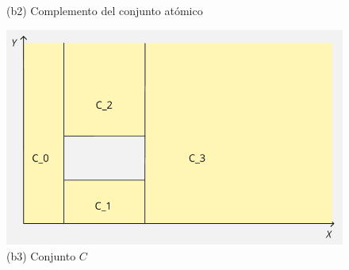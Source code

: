 \begin{figure}[H]
\begin{minipage}{0.31\textwidth}
        \caption*{     \centering (b2) Complemento del conjunto atómico}
    \end{minipage}
    \begin{minipage}{0.31\textwidth}
        \centering
        \includegraphics[width=\textwidth]{figures/Conceptos previos/Conjuntos/C1comp.png}
        \caption*{    \centering (b3) Conjunto $C$}
    \end{minipage}
    
    \vspace{1em}
    

\end{figure}
